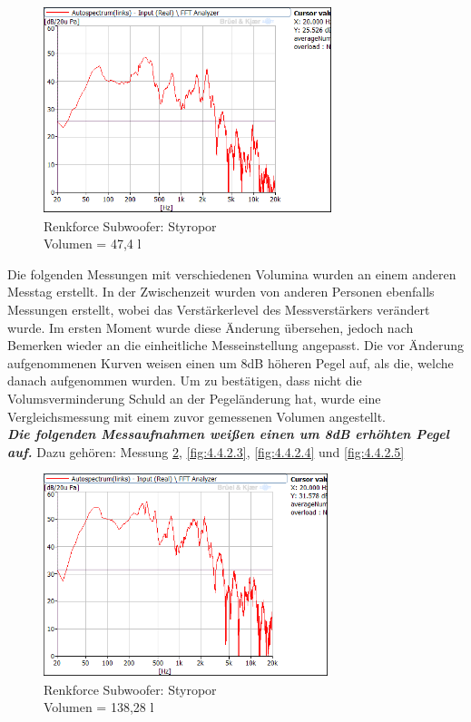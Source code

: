 \begin{figure} [H]
\centering
\includegraphics[width=0.75\textwidth]{img/Optimierung/Sub/RenkforceStyro_47l.png}
\caption{Renkforce Subwoofer: Styropor \\Volumen = 47,4 l}
\label{fig:4.4.2.1}
\end{figure}

Die folgenden Messungen mit verschiedenen Volumina wurden an einem anderen Messtag erstellt.
In der Zwischenzeit wurden von anderen Personen ebenfalls Messungen erstellt, wobei das Verstärkerlevel des Messverstärkers verändert wurde.
Im ersten Moment wurde diese Änderung übersehen, jedoch nach Bemerken wieder an die einheitliche Messeinstellung angepasst.
Die vor Änderung aufgenommenen Kurven weisen einen um 8dB höheren Pegel auf, als die, welche danach aufgenommen wurden.
Um zu bestätigen, dass nicht die Volumsverminderung Schuld an der Pegeländerung hat, wurde eine Vergleichsmessung mit einem zuvor gemessenen Volumen angestellt.\\

\textit{\textbf{ Die folgenden Messaufnahmen weißen einen um 8dB erhöhten Pegel auf.}} Dazu gehören: Messung \ref{fig:4.4.2.2}, \ref{fig:4.4.2.3}, \ref{fig:4.4.2.4} und \ref{fig:4.4.2.5}\\

\begin{figure} [H]
\centering
\includegraphics[width=0.74\textwidth]{img/Optimierung/Sub/RenkforceStyro_138l.png}
\caption{Renkforce Subwoofer: Styropor \\Volumen = 138,28 l}
\label{fig:4.4.2.2}
\end{figure}

